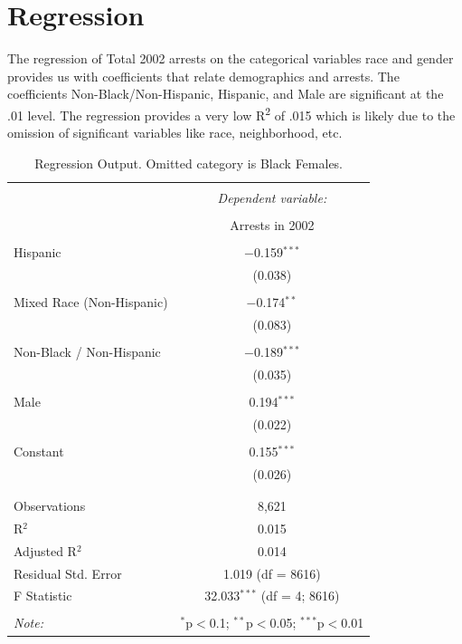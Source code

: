 \documentclass{article}
\begin{document}
\section{Regression}
	The regression of Total 2002 arrests on the categorical variables race and gender provides us with coefficients
that relate demographics and arrests. The coefficients Non-Black/Non-Hispanic, Hispanic, and Male are significant at the .01 level. 
The regression provides a very low R\textsuperscript{2} of .015 which is likely due to the omission of significant variables like race, neighborhood, etc. 

\begin{table}[!htbp] \centering 
  \caption{Regression Output. Omitted category is Black Females.} 
  \label{tab:regression} 
\begin{tabular}{@{\extracolsep{5pt}}lc} 
\\[-1.8ex]\hline 
\hline \\[-1.8ex] 
 & \multicolumn{1}{c}{\textit{Dependent variable:}} \\ 
\cline{2-2} 
\\[-1.8ex] & Arrests in 2002 \\ 
\hline \\[-1.8ex] 
 Hispanic & $-$0.159$^{***}$ \\ 
  & (0.038) \\ 
  & \\ 
 Mixed Race (Non-Hispanic) & $-$0.174$^{**}$ \\ 
  & (0.083) \\ 
  & \\ 
 Non-Black / Non-Hispanic & $-$0.189$^{***}$ \\ 
  & (0.035) \\ 
  & \\ 
 Male & 0.194$^{***}$ \\ 
  & (0.022) \\ 
  & \\ 
 Constant & 0.155$^{***}$ \\ 
  & (0.026) \\ 
  & \\ 
\hline \\[-1.8ex] 
Observations & 8,621 \\ 
R$^{2}$ & 0.015 \\ 
Adjusted R$^{2}$ & 0.014 \\ 
Residual Std. Error & 1.019 (df = 8616) \\ 
F Statistic & 32.033$^{***}$ (df = 4; 8616) \\ 
\hline 
\hline \\[-1.8ex] 
\textit{Note:}  & \multicolumn{1}{r}{$^{*}$p$<$0.1; $^{**}$p$<$0.05; $^{***}$p$<$0.01} \\ 
\end{tabular} 
\end{table} 
\end{document}
